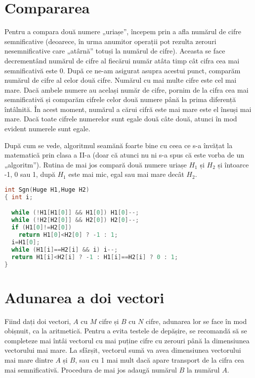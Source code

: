 \section{Compararea}

Pentru a compara două numere „uriașe”, începem prin a afla numărul de cifre
semnificative (deoarece, în urma anumitor operații pot rezulta zerouri
nesemnificative care „atârnă” totuși la numărul de cifre). Aceasta se face
decrementând numărul de cifre al fiecărui număr atâta timp cât cifra cea mai
semnificativă este 0. După ce ne-am asigurat asupra acestui punct, comparăm
numărul de cifre al celor două cifre. Numărul cu mai multe cifre este cel mai
mare. Dacă ambele numere au același număr de cifre, pornim de la cifra cea mai
semnificativă și comparăm cifrele celor două numere până la prima diferență
întâlnită. În acest moment, numărul a cărui cifră este mai mare este el însuși
mai mare. Dacă toate cifrele numerelor sunt egale două câte două, atunci în
mod evident numerele sunt egale.

După cum se vede, algoritmul seamănă foarte bine cu ceea ce s-a învățat la
matematică prin clasa a II-a (doar că atunci nu ni s-a spus că este vorba de
un „algoritm”). Rutina de mai jos compară două numere uriașe $H_1$ și $H_2$ și
întoarce -1, 0 sau 1, după $H_1$ este mai mic, egal sau mai mare decât $H_2$.

\begin{lstlisting}[language=C]
int Sgn(Huge H1,Huge H2)
{ int i;

  while (!H1[H1[0]] && H1[0]) H1[0]--;
  while (!H2[H2[0]] && H2[0]) H2[0]--;
  if (H1[0]!=H2[0])
    return H1[0]<H2[0] ? -1 : 1;
  i=H1[0];
  while (H1[i]==H2[i] && i) i--;
  return H1[i]<H2[i] ? -1 : H1[i]==H2[i] ? 0 : 1;
}
\end{lstlisting}

\section{Adunarea a doi vectori}

Fiind dați doi vectori, $A$ cu $M$ cifre și $B$ cu $N$ cifre, adunarea lor se
face în mod obișnuit, ca la aritmetică. Pentru a evita testele de depășire, se
recomandă să se completeze mai întâi vectorul cu mai puține cifre cu zerouri
până la dimensiunea vectorului mai mare. La sfârșit, vectorul sumă va avea
dimensiunea vectorului mai mare dintre $A$ și $B$, sau cu 1 mai mult dacă
apare transport de la cifra cea mai semnificativă. Procedura de mai jos adaugă
numărul $B$ la numărul $A$.

